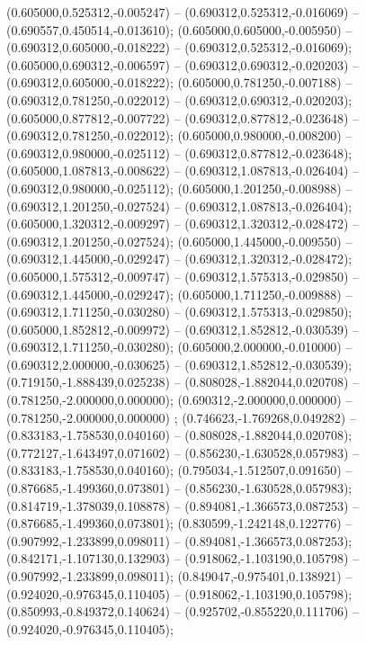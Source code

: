  (0.605000,0.525312,-0.005247) -- (0.690312,0.525312,-0.016069) -- (0.690557,0.450514,-0.013610);
 (0.605000,0.605000,-0.005950) -- (0.690312,0.605000,-0.018222) -- (0.690312,0.525312,-0.016069);
 (0.605000,0.690312,-0.006597) -- (0.690312,0.690312,-0.020203) -- (0.690312,0.605000,-0.018222);
 (0.605000,0.781250,-0.007188) -- (0.690312,0.781250,-0.022012) -- (0.690312,0.690312,-0.020203);
 (0.605000,0.877812,-0.007722) -- (0.690312,0.877812,-0.023648) -- (0.690312,0.781250,-0.022012);
 (0.605000,0.980000,-0.008200) -- (0.690312,0.980000,-0.025112) -- (0.690312,0.877812,-0.023648);
 (0.605000,1.087813,-0.008622) -- (0.690312,1.087813,-0.026404) -- (0.690312,0.980000,-0.025112);
 (0.605000,1.201250,-0.008988) -- (0.690312,1.201250,-0.027524) -- (0.690312,1.087813,-0.026404);
 (0.605000,1.320312,-0.009297) -- (0.690312,1.320312,-0.028472) -- (0.690312,1.201250,-0.027524);
 (0.605000,1.445000,-0.009550) -- (0.690312,1.445000,-0.029247) -- (0.690312,1.320312,-0.028472);
 (0.605000,1.575312,-0.009747) -- (0.690312,1.575313,-0.029850) -- (0.690312,1.445000,-0.029247);
 (0.605000,1.711250,-0.009888) -- (0.690312,1.711250,-0.030280) -- (0.690312,1.575313,-0.029850);
 (0.605000,1.852812,-0.009972) -- (0.690312,1.852812,-0.030539) -- (0.690312,1.711250,-0.030280);
 (0.605000,2.000000,-0.010000) -- (0.690312,2.000000,-0.030625) -- (0.690312,1.852812,-0.030539);
 (0.719150,-1.888439,0.025238) -- (0.808028,-1.882044,0.020708) -- (0.781250,-2.000000,0.000000);
 (0.690312,-2.000000,0.000000) -- (0.781250,-2.000000,0.000000) ;
 (0.746623,-1.769268,0.049282) -- (0.833183,-1.758530,0.040160) -- (0.808028,-1.882044,0.020708);
 (0.772127,-1.643497,0.071602) -- (0.856230,-1.630528,0.057983) -- (0.833183,-1.758530,0.040160);
 (0.795034,-1.512507,0.091650) -- (0.876685,-1.499360,0.073801) -- (0.856230,-1.630528,0.057983);
 (0.814719,-1.378039,0.108878) -- (0.894081,-1.366573,0.087253) -- (0.876685,-1.499360,0.073801);
 (0.830599,-1.242148,0.122776) -- (0.907992,-1.233899,0.098011) -- (0.894081,-1.366573,0.087253);
 (0.842171,-1.107130,0.132903) -- (0.918062,-1.103190,0.105798) -- (0.907992,-1.233899,0.098011);
 (0.849047,-0.975401,0.138921) -- (0.924020,-0.976345,0.110405) -- (0.918062,-1.103190,0.105798);
 (0.850993,-0.849372,0.140624) -- (0.925702,-0.855220,0.111706) -- (0.924020,-0.976345,0.110405);
